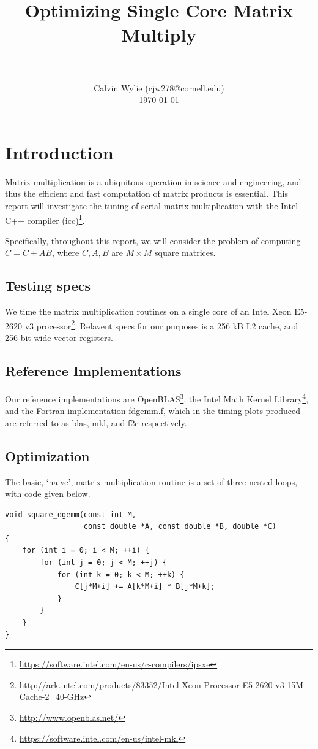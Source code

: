 \documentclass[fontsize=11pt]{scrartcl}
\title{
        \usefont{OT1}{bch}{b}{n}
        \horrule{0.5pt} \\[0.4cm]
        \huge Optimizing Single Core Matrix Multiply \\
        \horrule{2pt} \\[0.5cm]
}
\author{
        \normalfont                                 \normalsize
        Calvin Wylie (cjw278@cornell.edu)\\[-3pt]      \normalsize
        \today
}
\date{}
\numberwithin{equation}{section}        %
\numberwithin{figure}{section}          %
\numberwithin{table}{section}               %
\begin{document}
\maketitle

\section{Introduction}
Matrix multiplication is a ubiquitous operation in science and engineering,
and thus the efficient and fast computation of matrix products is essential.
This report will investigate the tuning of serial matrix multiplication with the 
Intel C++ compiler (icc)\footnote{\url{https://software.intel.com/en-us/c-compilers/ipsxe}}.

Specifically, throughout this report, we will consider the problem of computing
$C = C + A B$, where $C, A, B$ are $M \times M$ square matrices.

\subsection{Testing specs}

We time the matrix multiplication routines on a single core of an Intel Xeon
E5-2620 v3 processor\footnote{\url{http://ark.intel.com/products/83352/Intel-Xeon-Processor-E5-2620-v3-15M-Cache-2_40-GHz}}.  Relavent specs for our purposes is a 256 kB L2 cache,
and 256 bit wide vector registers.

\subsection{Reference Implementations}

Our reference implementations are OpenBLAS\footnote{\url{http://www.openblas.net/}},
the Intel Math Kernel Library\footnote{\url{https://software.intel.com/en-us/intel-mkl}}, 
and the Fortran implementation fdgemm.f, which in the timing plots produced are
referred to as blas, mkl, and f2c respectively.

\subsection{Optimization}

The basic, `naive', matrix multiplication routine is a set of three nested loops, 
with code given below.

\begin{lstlisting}[frame = single, caption={Naive Square Matrix Multiply}]
void square_dgemm(const int M, 
                  const double *A, const double *B, double *C)
{
    for (int i = 0; i < M; ++i) {
        for (int j = 0; j < M; ++j) {
            for (int k = 0; k < M; ++k) {
                C[j*M+i] += A[k*M+i] * B[j*M+k];
            }
        }
    }
}
\end{lstlisting}
\end{document}
